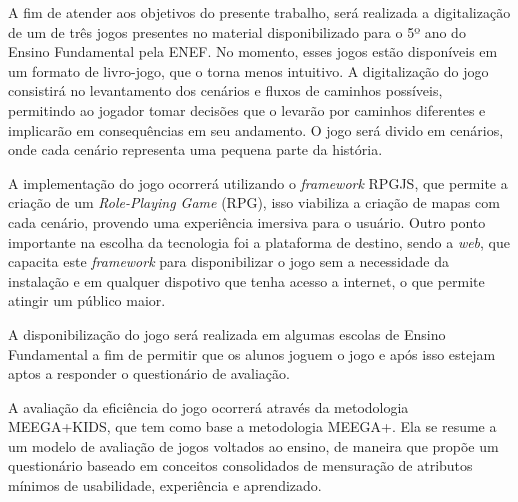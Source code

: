 A fim de atender aos objetivos do presente trabalho, será realizada a digitalização de um de três jogos
presentes no material disponibilizado para o 5º ano do Ensino Fundamental pela ENEF. No momento, esses jogos
estão disponíveis em um formato de livro-jogo, que o torna menos intuitivo. A digitalização do jogo consistirá
no levantamento dos cenários e fluxos de caminhos possíveis, permitindo ao jogador tomar decisões que o levarão
por caminhos diferentes e implicarão em consequências em seu andamento. O jogo será divido em cenários,
onde cada cenário representa uma pequena parte da história.

A implementação do jogo ocorrerá utilizando o \textit{framework} RPGJS, que permite a criação de um
\textit{Role-Playing Game} (RPG), isso viabiliza a criação de mapas com cada cenário, provendo uma experiência
imersiva para o usuário. Outro ponto importante na escolha da tecnologia foi a plataforma de destino, sendo a
\textit{web}, que capacita este \textit{framework} para disponibilizar o jogo sem a necessidade da instalação e
em qualquer dispotivo que tenha acesso a internet, o que permite atingir um público maior.

A disponibilização do jogo será realizada em algumas escolas de Ensino Fundamental a fim de permitir que os
alunos joguem o jogo e após isso estejam aptos a responder o questionário de avaliação.

A avaliação da eficiência do jogo ocorrerá através da metodologia MEEGA+KIDS, que tem como base a metodologia
MEEGA+. Ela se resume a um modelo de avaliação de jogos voltados ao ensino, de maneira que propõe um
questionário baseado em conceitos consolidados de mensuração de atributos mínimos de usabilidade, experiência e
aprendizado.

